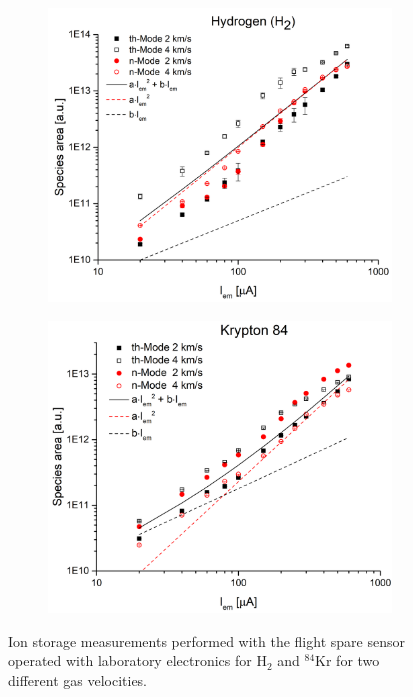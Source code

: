 		\begin{figure}[h] %
			\begin{subfigure}{0.5\textwidth}
				\centering
				\includegraphics[width = \textwidth]{Experiments/FSLabIonStorageH2.png}
			\end{subfigure}
			\begin{subfigure}{0.5\textwidth}
				\centering
				\includegraphics[width = \textwidth]{Experiments/FSLabIonStorageKr84.png}
			\end{subfigure}
			\caption{Ion storage measurements performed with the flight spare sensor operated with laboratory electronics for H$_2$ and $^{84}$Kr for two different gas velocities.}
			\label{fig:ExpFSFlightSenIonStor}
		\end{figure}
		
